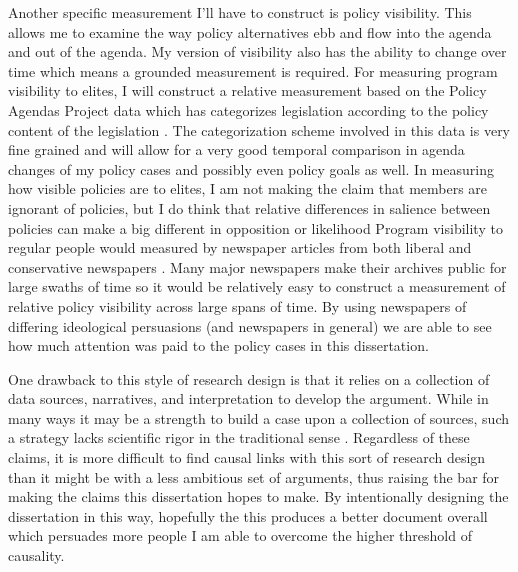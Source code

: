 \documentclass[12pt]{article}
\begin{document}
Another specific measurement I'll have to construct is policy visibility. This allows me to examine the way policy alternatives ebb and flow into the agenda and out of the agenda. My version of visibility also has the ability to change over time which means a grounded measurement is required. For measuring program visibility to elites, I will construct a relative measurement based on the Policy Agendas Project data which has categorizes legislation according to the policy content of the legislation \citep{baumgartner2009}. The categorization scheme involved in this data is very fine grained and will allow for a very good temporal comparison in agenda changes of my policy cases and possibly even policy goals as well. In measuring how visible policies are to elites, I am not making the claim that members are ignorant of policies, but I do think that relative differences in salience between policies can make a big different in opposition or likelihood Program visibility to regular people would measured by newspaper articles from both liberal and conservative newspapers \citep{segal2002, gentzkow2010}. Many major newspapers make their archives public for large swaths of time so it would be relatively easy to construct a measurement of relative policy visibility across large spans of time. By using newspapers of differing ideological persuasions (and newspapers in general) we are able to see how much attention was paid to the policy cases in this dissertation.

One drawback to this style of research design is that it relies on a collection of data sources, narratives, and interpretation to develop the argument. While in many ways it may be a strength to build a case upon a collection of sources, such a strategy lacks scientific rigor in the traditional sense \citep{king1994}. Regardless of these claims, it is more difficult to find causal links with this sort of research design than it might be with a less ambitious set of arguments, thus raising the bar for making the claims this dissertation hopes to make. By intentionally designing the dissertation in this way, hopefully the this produces a better document overall which persuades more people I am able to overcome the higher threshold of causality.
\end{document}
